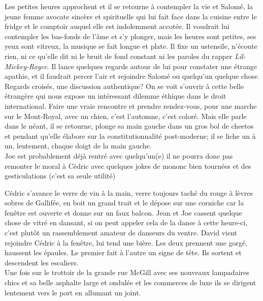 \documentclass{article}
\begin{document}
Les petites heures approchent et il se retourne à contempler la vie et Salomé,
la jeune femme avocate sincère et spirituelle qui lui fait face dans la cuisine
entre le fridge et le comptoir auquel elle est indolemment accotée. Il voudrait
lui contempler les bas-fonds de l'âme et s'y plonger, mais les heures sont
petites, ses yeux sont vitreux, la musique se fait longue et plate. Il fixe un
ustensile, n'écoute rien, ni ce qu'elle dit ni le bruit de fond constant ni les
paroles du rapper \textit{Lil-Mickey-Royce}. Il lance quelques regards autour de
lui pour constater une étrange apathie, et il faudrait percer l'air et rejoindre
Salomé ou quelqu'un quelque chose. Regards croisés, une discussion authentique?
On se voit s'ouvrir à cette belle étrangère qui nous expose un intéressant
dilemme éthique dans le droit international. Faire une vraie rencontre et
prendre rendez-vous, pour une marche sur le Mont-Royal, avec un chien, c'est
l'automne, c'est coloré. Mais elle parle dans le néant, il se retourne, plonge
sa main gauche dans un gros bol de cheetos et pendant qu'elle élabore sur la
constitutionnalité post-moderne; il se liche un à un, lentement, chaque doigt de
la main gauche. \\


Joe est probablement déjà rentré avec quelqu'un(e) il ne pourra donc pas
remonter le moral à Cédric avec quelques jokes de mononc bien tournées et des
gesticulations (c'est sa seule utilité)

Cédric s'avance le verre de vin à la main, verre toujours
taché du rouge à lèvres sobres de Gallifée, en boit un grand trait et le dépose sur
une corniche car la fenêtre est ouverte et donne sur un faux balcon. Jean et Joe
cassent quelque chose de vitré en dansant, si on peut appeler cela de
la danse à cette heure-ci, c'est plutôt un rassemblement amateur de danseurs
du ventre. David vient rejoindre Cédric à la fenêtre, lui tend une bière.
Les deux prennent une gorgé, haussent les épaules. Le premier fait à l'autre un
signe de tête. Ils sortent et descendent les escaliers.\\

Une fois
sur le trottoir de la grande
rue McGill avec ses nouveaux lampadaires chics et sa belle asphalte large et
ondulée et les commerces de luxe ils se dirigent lentement vers le port en
allumant un joint.
\end{document}
